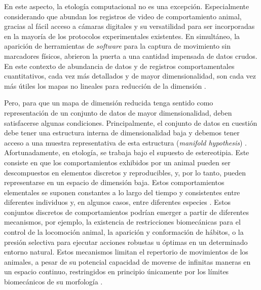 En este aspecto, la etología computacional no es una excepción. Especialmente considerando que abundan los registros de video de comportamiento animal, gracias al fácil acceso a cámaras digitales y su versatilidad para ser incorporadas en la mayoría de los protocolos experimentales existentes. En simultáneo, la aparición de herramientas de \textit{software} para la captura de movimiento sin marcadores físicos, abrieron la puerta a una cantidad impensada de datos crudos. En este contexto de abundancia de datos y de registros comportamentales cuantitativos, cada vez más detallados y de mayor dimensionalidad, son cada vez más útiles los mapas no lineales para reducción de la dimensión \cite{berman_mapping}.

Pero, para que un mapa de dimensión reducida tenga sentido como representación de un conjunto de datos de mayor dimensionalidad, deben satisfacerse algunas condiciones. Principalmente, el conjunto de datos en cuestión debe tener una estructura interna de dimensionalidad baja y debemos tener acceso a una muestra representativa de esta estructura (\textit{manifold hypothesis}) \cite{manifold_hypothesis}. Afortunadamente, en etología, se trabaja bajo el supuesto de estereotipia. Este consiste en que los comportamientos exhibidos por un animal pueden ser descompuestos en elementos discretos y reproducibles, y, por lo tanto, pueden representarse en un espacio de dimensión baja. Estos comportamientos elementales se suponen constantes a lo largo del tiempo y consistentes entre diferentes individuos y, en algunos casos, entre diferentes especies \cite{hernandez_fly_species}. Estos conjuntos discretos de comportamientos podrían emerger a partir de diferentes mecanismos, por ejemplo, la existencia de restricciones biomecánicas para el control de la locomoción animal, la aparición y conformación de hábitos, o la presión selectiva para ejecutar acciones robustas u óptimas en un determinado entorno natural. Estos mecanismos limitan el repertorio de movimientos de los animales, a pesar de su potencial capacidad de moverse de infinitas maneras en un espacio continuo, restringidos en principio únicamente por los límites biomecánicos de su morfología \cite{berman_mapping, lehner_stereotipy}.


